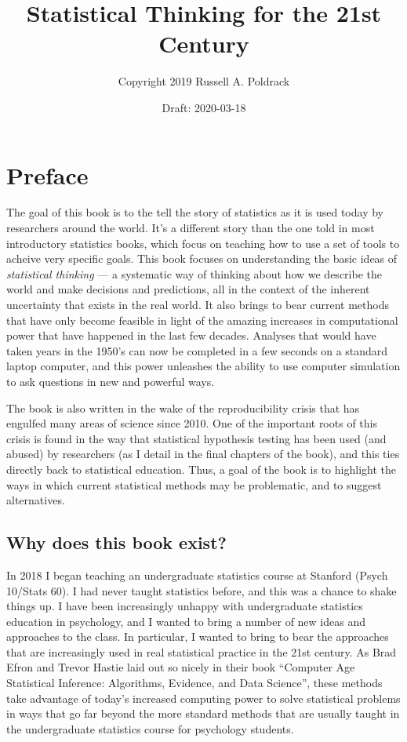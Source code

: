 \documentclass[12pt,]{book}
\title{Statistical Thinking for the 21st Century}
\author{Copyright 2019 Russell A. Poldrack}
\date{Draft: 2020-03-18}
\begin{document}
\maketitle

{
\setcounter{tocdepth}{1}
\tableofcontents
}
\hypertarget{preface}{%
\chapter*{Preface}\label{preface}}

The goal of this book is to the tell the story of statistics as it is used today by researchers around the world. It's a different story than the one told in most introductory statistics books, which focus on teaching how to use a set of tools to acheive very specific goals. This book focuses on understanding the basic ideas of \emph{statistical thinking} --- a systematic way of thinking about how we describe the world and make decisions and predictions, all in the context of the inherent uncertainty that exists in the real world. It also brings to bear current methods that have only become feasible in light of the amazing increases in computational power that have happened in the last few decades. Analyses that would have taken years in the 1950's can now be completed in a few seconds on a standard laptop computer, and this power unleashes the ability to use computer simulation to ask questions in new and powerful ways.

The book is also written in the wake of the reproducibility crisis that has engulfed many areas of science since 2010. One of the important roots of this crisis is found in the way that statistical hypothesis testing has been used (and abused) by researchers (as I detail in the final chapters of the book), and this ties directly back to statistical education. Thus, a goal of the book is to highlight the ways in which current statistical methods may be problematic, and to suggest alternatives.

\hypertarget{why-does-this-book-exist}{%
\section{Why does this book exist?}\label{why-does-this-book-exist}}

In 2018 I began teaching an undergraduate statistics course at Stanford (Psych 10/Stats 60). I had never taught statistics before, and this was a chance to shake things up. I have been increasingly unhappy with undergraduate statistics education in psychology, and I wanted to bring a number of new ideas and approaches to the class. In particular, I wanted to bring to bear the approaches that are increasingly used in real statistical practice in the 21st century. As Brad Efron and Trevor Hastie laid out so nicely in their book ``Computer Age Statistical Inference: Algorithms, Evidence, and Data Science'', these methods take advantage of today's increased computing power to solve statistical problems in ways that go far beyond the more standard methods that are usually taught in the undergraduate statistics course for psychology students.
\end{document}
